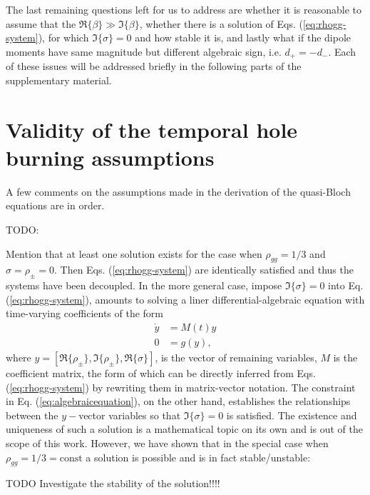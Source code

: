 \documentclass[preprint,secnumarabic,amssymb, nobibnotes, aip, prd]{revtex4-1}
\begin{document}
The last remaining questions left for us to address are whether it is reasonable to assume that the $\Re\{\beta\} \gg \Im\{\beta\}$, whether there is a solution of Eqs. (\ref{eq:rhogg-system}), for which $\Im\{\sigma\} = 0$ and how stable it is, and lastly what if the dipole moments have same magnitude but different algebraic sign, i.e. $d_+ = -d_-$. Each of these issues will be addressed briefly in the following parts of the supplementary material.  



\section{Validity of the temporal hole burning assumptions}
A few comments on the assumptions made in the derivation of the quasi-Bloch equations are in order. 


TODO:

Mention that at least one solution exists for the case when $\rho_{gg} = 1/3$ and $\sigma = \rho_{\pm} = 0$. Then Eqs. (\ref{eq:rhogg-system}) are identically satisfied and thus the systems have been decoupled. In the more general case, impose $\Im\{\sigma\}=0$ into Eq. (\ref{eq:rhogg-system}), amounts to solving a liner differential-algebraic equation with time-varying coefficients of the form 
\begin{align}
\dot{y} &= M(t)y \label{eq:diffequation} \\
0 &= g(y) \label{eq:algebraicequation},
\end{align}
where $y = [\Re\{\rho_{\pm}\},\Im\{\rho_{\pm}\},\Re\{\sigma\}]$, is the vector of remaining variables, $M$ is the coefficient matrix, the form of which can be directly inferred from Eqs. (\ref{eq:rhogg-system}) by rewriting them in matrix-vector notation. The constraint in Eq. (\ref{eq:algebraicequation}), on the other hand, establishes the relationships between the $y-$vector variables so that $\Im\{\sigma\} = 0$ is satisfied. The existence and uniqueness of such a solution is a mathematical topic on its own and is out of the scope of this work. However, we have shown that in the special case when $\rho_{gg} = 1/3 = \text{const}$ a solution is possible and is 
in fact stable/unstable:

TODO Investigate the stability of the solution!!!!
\end{document}
